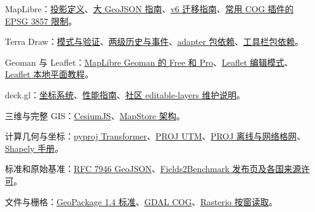 \documentclass[11pt,a4paper]{article}
\newcommand{\referencetext}[1]{{\fontsize{9.4}{14.2}\selectfont#1\par}}
\begin{document}
\referencetext{[T3] MapLibre：\href{https://maplibre.org/maplibre-style-spec/types/\#projectiondefinition}{投影定义}、\href{https://maplibre.org/maplibre-gl-js/docs/guides/large-data/}{大 GeoJSON 指南}、\href{https://maplibre.org/maplibre-gl-js/docs/guides/v5-to-v6-migration-guide/}{v6 迁移指南}、\href{https://github.com/geomatico/maplibre-cog-protocol}{常用 COG 插件的 EPSG 3857 限制}。}
\referencetext{[T4] Terra Draw：\href{https://github.com/JamesLMilner/terra-draw/blob/main/guides/4.MODES.md}{模式与验证}、\href{https://github.com/JamesLMilner/terra-draw/blob/main/guides/6.EVENTS.md}{两级历史与事件}、\href{https://raw.githubusercontent.com/JamesLMilner/terra-draw/main/packages/terra-draw-maplibre-gl-adapter/package.json}{adapter 包依赖}、\href{https://raw.githubusercontent.com/watergis/maplibre-gl-terradraw/main/package.json}{工具栏包依赖}。}
\referencetext{[T5] Geoman 与 Leaflet：\href{https://geoman.io/docs/maplibre}{MapLibre Geoman 的 Free 和 Pro}、\href{https://geoman.io/docs/leaflet/modes/edit-mode}{Leaflet 编辑模式}、\href{https://leafletjs.com/examples/crs-simple/}{Leaflet 本地平面教程}。}
\referencetext{[T6] deck.gl：\href{https://deck.gl/docs/developer-guide/coordinate-systems}{坐标系统}、\href{https://deck.gl/docs/developer-guide/performance}{性能指南}、\href{https://visgl.github.io/deck.gl-community/docs/modules/editable-layers}{社区 editable-layers 维护说明}。}
\referencetext{[T7] 三维与完整 GIS：\href{https://cesium.com/platform/cesiumjs/}{CesiumJS}、\href{https://docs.mapstore.geosolutionsgroup.com/en/latest/developer-guide/infrastructure-and-general-architecture/}{MapStore 架构}。}
\referencetext{[T8] 计算几何与坐标：\href{https://pyproj4.github.io/pyproj/stable/api/transformer.html}{pyproj Transformer}、\href{https://proj.org/en/stable/operations/projections/utm.html}{PROJ UTM}、\href{https://proj.org/en/stable/usage/network.html}{PROJ 离线与网络格网}、\href{https://shapely.readthedocs.io/en/stable/manual.html}{Shapely 手册}。}
\referencetext{[T9] 标准和原始基准：\href{https://datatracker.ietf.org/doc/html/rfc7946}{RFC 7946 GeoJSON}、\href{https://zenodo.org/records/14524735}{Fields2Benchmark 发布页及各国来源许可}。}
\referencetext{[T10] 文件与栅格：\href{https://www.geopackage.org/spec140/}{GeoPackage 1.4 标准}、\href{https://gdal.org/en/stable/drivers/raster/cog.html}{GDAL COG}、\href{https://rasterio.readthedocs.io/en/latest/topics/windowed-rw.html}{Rasterio 按窗读取}。}
\end{document}
